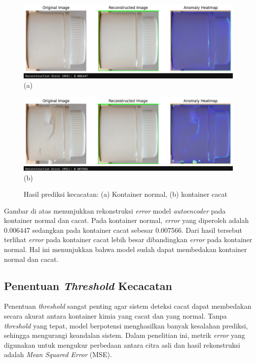 \begin{figure}[H]
  \centering
  \begin{minipage}{0.8\textwidth}
    \centering
    \includegraphics[width=\textwidth]{gambar/kontainer_bagus.jpeg}
    (a)
  \end{minipage}
  \vspace{1em}

  \begin{minipage}{0.8\textwidth}
    \centering
    \includegraphics[width=\textwidth]{gambar/kontainer_cacat.jpeg}
    (b)
  \end{minipage}
  \caption{Hasil prediksi kecacatan: (a) Kontainer normal, (b) kontainer cacat}
  \label{fig:autoencoder-test}
  \vspace{-1em}
\end{figure}

Gambar di atas menunjukkan rekonstruksi \textit{error} model
\textit{autoencoder} pada kontainer normal dan cacat. Pada kontainer
normal, \textit{error} yang diperoleh adalah 0.006447 sedangkan pada
kontainer cacat sebesar 0.007566. Dari hasil tersebut terlihat
\textit{error} pada kontainer cacat lebih besar dibandingkan
\textit{error} pada kontainer normal. Hal ini menunjukkan bahwa model
sudah dapat membedakan kontainer normal dan cacat.

\vspace{1em}

\subsection{Penentuan \textit{Threshold} Kecacatan}
Penentuan \textit{threshold} sangat penting agar sistem deteksi cacat dapat
membedakan secara akurat antara kontainer kimia yang cacat dan yang
normal. Tanpa \textit{threshold} yang tepat, model berpotensi menghasilkan
banyak kesalahan prediksi, sehingga mengurangi keandalan sistem.
Dalam penelitian
ini, metrik \textit{error} yang digunakan untuk mengukur perbedaan antara
citra asli dan hasil rekonstruksi adalah \textit{Mean Squared Error} (MSE).

